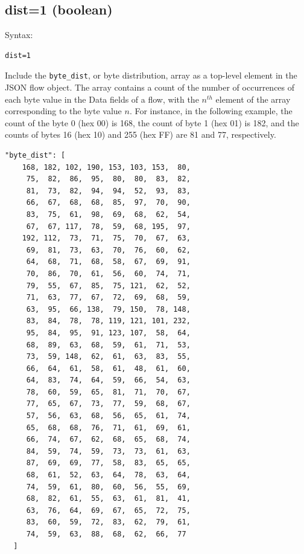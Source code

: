 \documentclass{book}
\begin{document}
\subsection{dist=1 (boolean)}
\label{dist}
\begin{mdframed}[style=aaa]
Syntax:
  \begin{verbatim}
dist=1                     
  \end{verbatim}
\end{mdframed}
Include the \texttt{byte\_dist}, or byte distribution, array as a
top-level element in the JSON flow object. The array contains a count
of the number of occurrences of each byte value in the Data fields of a
flow, with the $n^{th}$ element of the array corresponding
to the byte value $n$.   For instance, in the following
example, the count of the byte 0 (hex 00) is 168, the count of byte 1 (hex 01)
is 182, and the counts of bytes 16 (hex 10) and  255 (hex FF)
are 81 and 77, respectively.  
\begin{mdframed}[style=cli]
  \begin{verbatim}
"byte_dist": [
    168, 182, 102, 190, 153, 103, 153,  80,
     75,  82,  86,  95,  80,  80,  83,  82,
     81,  73,  82,  94,  94,  52,  93,  83,
     66,  67,  68,  68,  85,  97,  70,  90,
     83,  75,  61,  98,  69,  68,  62,  54,
     67,  67, 117,  78,  59,  68, 195,  97,
    192, 112,  73,  71,  75,  70,  67,  63,
     69,  81,  73,  63,  70,  76,  60,  62,
     64,  68,  71,  68,  58,  67,  69,  91,
     70,  86,  70,  61,  56,  60,  74,  71,
     79,  55,  67,  85,  75, 121,  62,  52,
     71,  63,  77,  67,  72,  69,  68,  59,
     63,  95,  66, 138,  79, 150,  78, 148,
     83,  84,  78,  78, 119, 121, 101, 232,
     95,  84,  95,  91, 123, 107,  58,  64,
     68,  89,  63,  68,  59,  61,  71,  53,
     73,  59, 148,  62,  61,  63,  83,  55,
     66,  64,  61,  58,  61,  48,  61,  60,
     64,  83,  74,  64,  59,  66,  54,  63,
     78,  60,  59,  65,  81,  71,  70,  67,
     77,  65,  67,  73,  77,  59,  68,  67,
     57,  56,  63,  68,  56,  65,  61,  74,
     65,  68,  68,  76,  71,  61,  69,  61,
     66,  74,  67,  62,  68,  65,  68,  74,
     84,  59,  74,  59,  73,  73,  61,  63,
     87,  69,  69,  77,  58,  83,  65,  65,
     68,  61,  52,  63,  64,  78,  63,  64,
     74,  59,  61,  80,  60,  56,  55,  69,
     68,  82,  61,  55,  63,  61,  81,  41,
     63,  76,  64,  69,  67,  65,  72,  75,
     83,  60,  59,  72,  83,  62,  79,  61,
     74,  59,  63,  88,  68,  62,  66,  77
  ] 
\end{verbatim}
\end{mdframed}
\end{document}

